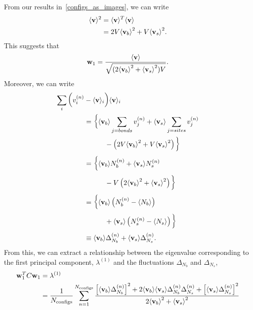 \documentclass[../main.tex]{subfiles}
\begin{document}
From our results in~\ref{configs_as_images}, we can write
\begin{align}
    \langle \mathbf{v}\rangle^2
    &= \langle \mathbf{v}\rangle^{T} \langle \mathbf{v}\rangle \\
    &= 2V{\langle \mathbf{v}_b\rangle}^2 + V {\langle \mathbf{v}_s\rangle}^2.
\end{align}
This suggests that
\begin{equation}
    \mathbf{w}_1 = \frac{\langle \mathbf{v}\rangle}{\sqrt{(2{\langle \mathbf{v}_b\rangle}^2 +
    {\langle \mathbf{v}_s\rangle}^2)V}}.
\end{equation}
Moreover, we can write
\begin{align}
    \sum_i \bigg(v_{i}^{(n)}&-\langle\mathbf{v}\rangle_i \bigg)
        \langle\mathbf{v}\rangle_i\\
        &= \bigg\{{\langle \mathbf{v}_b\rangle}\sum_{j=bonds}v_j^{(n)}+{\langle \mathbf{v}_s\rangle}\sum_{j=sites}v_j^{(n)}\\
        &\quad\quad\quad-\left(2V{\langle \mathbf{v}_b\rangle}^2+V {\langle \mathbf{v}_s\rangle}^2\right)\bigg\}\\
        &= \bigg\{{\langle \mathbf{v}_b\rangle} N_b^{(n)}+{\langle \mathbf{v}_s\rangle} N_{s}^{(n)}\\
        &\quad\quad\quad-V\left(2{\langle \mathbf{v}_b\rangle}^2+{\langle \mathbf{v}_s\rangle}^2\right)\bigg\}\\
        &= \bigg\{{\langle \mathbf{v}_b\rangle}\left(N_b^{(n)}-\langle N_b\rangle\right)\\
        &\quad\quad\quad+{\langle \mathbf{v}_s\rangle} \left(N_s^{(n)}-\langle N_s\rangle\right)\bigg\}\\
        &\equiv {\langle \mathbf{v}_b\rangle} \Delta_{N_b}^{(n)} + {\langle \mathbf{v}_s\rangle} \Delta_{N_s}^{(n)}.
\end{align}
From this, we can extract a relationship between the eigenvalue corresponding to the first principal component,
$\lambda^{(1)}$ and the fluctuations $\Delta_{N_b}$ and $\Delta_{N_s}$,
\begin{align*}
    \mathbf{w}_1^{T} C \mathbf{w}_1
        &= \lambda^{(1)}\\
        &= \frac{1}{N_{\mathrm{configs}}}\sum_{n=1}^{N_{\mathrm{configs}}} \frac{%
          {\left[\bondavg \Delta_{N_b}^{(n)}\right]}^2 + 2\bondavg \siteavg \Delta_{N_b}^{(n)} \Delta_{N_s}^{(n)}
        + {\left[\siteavg \Delta_{N_s}^{(n)}\right]}^2 }{2\bondavg^2 + \siteavg^2}
\end{align*}
\end{document}
